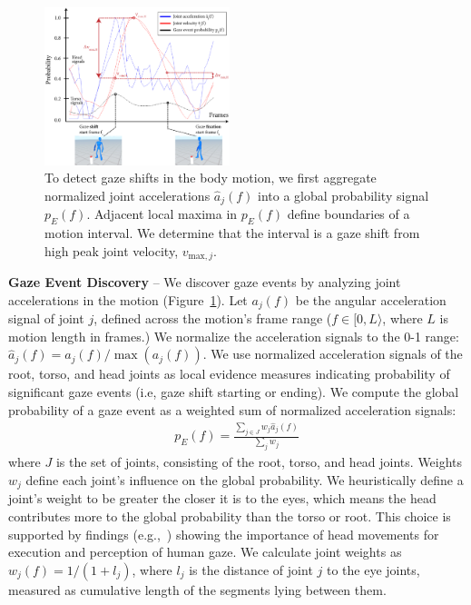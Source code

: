 \begin{figure}
\centering
\includegraphics[width=0.48\textwidth]{Figures/GazeInstanceInference.pdf}
\caption{To detect gaze shifts in the body motion, we first aggregate normalized joint accelerations $\hat{a}_j(f)$ into a global probability signal $p_E(f)$. Adjacent local maxima in $p_E(f)$ define boundaries of a motion interval. We determine that the interval is a gaze shift from high peak joint velocity, $v_{\mathrm{max},j}$.}
\label{fig:GazeInstanceInference}
\end{figure}

\noindent\textbf{Gaze Event Discovery} -- We discover gaze events by analyzing joint accelerations in the motion (Figure~\ref{fig:GazeInstanceInference}). Let $a_j(f)$ be the angular acceleration signal of joint $j$, defined across the motion's frame range ($f \in [0, L\rangle$, where $L$ is motion length in frames.) We normalize the acceleration signals to the 0-1 range: $\hat{a}_j(f) = a_j(f) / \mathop{max}(a_j(f))$. We use normalized acceleration signals of the root, torso, and head joints as local evidence measures indicating probability of significant gaze events (i.e, gaze shift starting or ending). We compute the global probability of a gaze event as a weighted sum of normalized acceleration signals:
%
\begin{align} \label{eq:GazeEventProbability}
p_E(f) = \frac{\sum_{j \in J} w_j \hat{a}_j(f)}{\sum_j w_j}
\end{align}
%
where $J$ is the set of joints, consisting of the root, torso, and head joints. Weights $w_j$ define each joint's influence on the global probability. We heuristically define a joint's weight to be greater the closer it is to the eyes, which means the head contributes more to the global probability than the torso or root. This choice is supported by findings (e.g.,~\cite{hietanen1999does}) showing the importance of head movements for execution and perception of human gaze. We calculate joint weights as $w_j(f) = 1/(1 + l_j)$, where $l_j$ is the distance of joint $j$ to the eye joints, measured as cumulative length of the segments lying between them.


